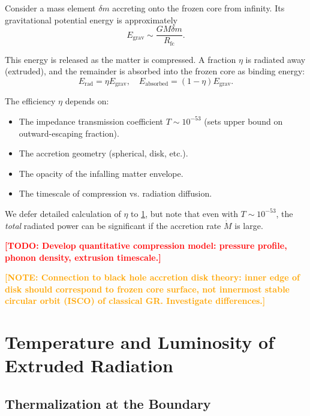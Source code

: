 \documentclass[12pt,a4paper]{article}
\newcommand{\TODO}[1]{\textcolor{red}{\textbf{[TODO: #1]}}}
\newcommand{\NOTE}[1]{\textcolor{orange}{\textbf{[NOTE: #1]}}}
\newcommand{\Rfc}{R_\text{fc}}
\theoremstyle{definition}
\begin{document}
Consider a mass element $\delta m$ accreting onto the frozen core from infinity. Its gravitational potential energy is approximately
\begin{equation}
E_\text{grav} \sim \frac{GM \delta m}{\Rfc}.
\label{eq:E_grav}
\end{equation}

This energy is released as the matter is compressed. A fraction $\eta$ is radiated away (extruded), and the remainder is absorbed into the frozen core as binding energy:
\begin{equation}
E_\text{rad} = \eta E_\text{grav}, \quad E_\text{absorbed} = (1-\eta) E_\text{grav}.
\label{eq:energy_partition}
\end{equation}

The efficiency $\eta$ depends on:
\begin{itemize}
  \item The impedance transmission coefficient $T \sim 10^{-53}$ (sets upper bound on outward-escaping fraction).
  \item The accretion geometry (spherical, disk, etc.).
  \item The opacity of the infalling matter envelope.
  \item The timescale of compression vs. radiation diffusion.
\end{itemize}

We defer detailed calculation of $\eta$ to \cref{sec:temperature_luminosity}, but note that even with $T \sim 10^{-53}$, the \emph{total} radiated power can be significant if the accretion rate $\dot{M}$ is large.

\TODO{Develop quantitative compression model: pressure profile, phonon density, extrusion timescale.}

\NOTE{Connection to black hole accretion disk theory: inner edge of disk should correspond to frozen core surface, not innermost stable circular orbit (ISCO) of classical GR. Investigate differences.}

\section{Temperature and Luminosity of Extruded Radiation}
\label{sec:temperature_luminosity}

\subsection{Thermalization at the Boundary}
\label{subsec:thermalization}
\end{document}
